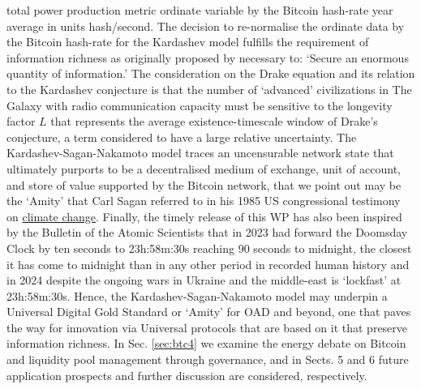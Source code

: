 \documentclass[final,5p,times,twocolumn,authoryear]{elsarticle}
\begin{document}
total power production metric ordinate variable by the Bitcoin hash-rate year average in units hash/second. The decision to re-normalise the ordinate data by the Bitcoin hash-rate for the Kardashev model fulfills the requirement of information richness as originally proposed by \cite{kar64} necessary to: `Secure an enormous quantity of information.' The consideration on the Drake equation and its relation to the Kardashev conjecture is that the number of `advanced' civilizations in The Galaxy with radio communication capacity must be sensitive to the longevity factor $L$ that represents the average existence-timescale window of Drake's conjecture, a term considered to have a large relative uncertainty. The Kardashev-Sagan-Nakamoto model traces an uncensurable network state that ultimately purports to be a decentralised medium of exchange, unit of account, and store of value supported by the Bitcoin network, that we point out may be the `Amity' that Carl Sagan referred to in his 1985 US congressional testimony on  \href{https://www.youtube.com/watch?v=Wp-WiNXH6hI}{climate change}. Finally, the timely release of this WP has also been inspired by the Bulletin of the Atomic Scientists that in 2023 had forward the Doomsday Clock by ten seconds to 23h:58m:30s reaching 90 seconds to midnight, the closest it has come to midnight than in any other period in recorded human history and in 2024 despite the ongoing wars in Ukraine and the middle-east is `lockfast' at 23h:58m:30s. Hence, the Kardashev-Sagan-Nakamoto model may underpin a Universal Digital Gold Standard or `Amity' for OAD and beyond, one that paves the way for innovation via Universal protocols that are based on it that preserve information richness.  In Sec. \ref{sec:btc4} we examine the energy debate on Bitcoin and liquidity pool management through governance, and in Sects. 5 and 6 future application prospects and further discussion are considered, respectively.



\end{document}
